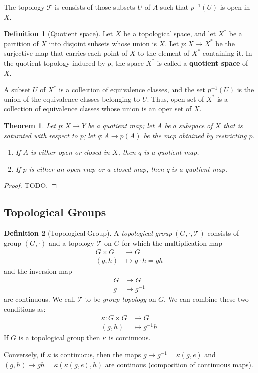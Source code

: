 \documentclass[12pt,reqno]{amsart}
\theoremstyle{plain}
\newtheorem{thm}{Theorem}
\theoremstyle{definition}
\newtheorem{defn}{Definition}
\newcommand{\cal}[1]{\mathcal{#1}}
\begin{document}
The topology $\cal T$ is consists of those subsets $U$ of $A$ such that $p^{-1}(U)$ is open in $X$.

\begin{defn}[Quotient space]
    Let $X$ be a topological space, and let $X^*$ be a partition of $X$ into disjoint subsets whose union is $X$. Let $p : X \to X^*$ be the surjective map that carries each point of $X$ to the element of $X^*$ containing it. In the quotient topology induced by $p$, the space $X^*$ is called a {\bf quotient space} of $X$.
\end{defn}
A subset $U$ of $X^*$ is a collection of equivalence classes, and the set $p^{-1}(U)$ is the union of the equivalence classes belonging to $U$. Thus, open set of $X^*$ is a collection of equivalence classes whose union is an open set of $X$.

\begin{thm}
    Let $p : X \to Y$ be a quotient map; let $A$ be a subspace of $X$ that is saturated with respect to $p$; let $q : A \to p(A)$ be the map obtained by restricting $p$.
    \begin{enumerate}
        \item If $A$ is either open or closed in $X$, then $q$ is a quotient map.
        \item If $p$ is either an open map or a closed map, then $q$ is a quotient map.
    \end{enumerate}
\end{thm}
\begin{proof}
    TODO.
\end{proof}

\subsection{Topological Groups}
\begin{defn}[Topological Group]
    A {\it topological group} $(G,\cdot,\cal T)$ consists of group $(G,\cdot)$ and a topology $\cal T$ on $G$ for which the multiplication map
    $$
    \begin{aligned}
        G \times G &\to G \\
        (g,h) &\mapsto g \cdot h = gh
    \end{aligned} 
    $$
    and the inversion map
    $$
    \begin{aligned}
        G &\to G \\
        g &\mapsto g^{-1}
    \end{aligned} 
    $$
    are continuous. We call $\cal T$ to be {\it group topology} on $G$. We can combine these two conditions as:
    $$
    \begin{aligned}
        \kappa \colon G \times G &\to G \\
        (g,h) &\mapsto g^{-1}h
    \end{aligned} 
    $$
    If $G$ is a topological group then $\kappa$ is continuous.
\end{defn}
Conversely, if $\kappa$ is continuous, then the maps $g \mapsto g^{-1} = \kappa(g,e)$ and $(g,h) \mapsto gh = \kappa(\kappa(g,e),h)$ are continous (composition of continuous maps).
\end{document}

